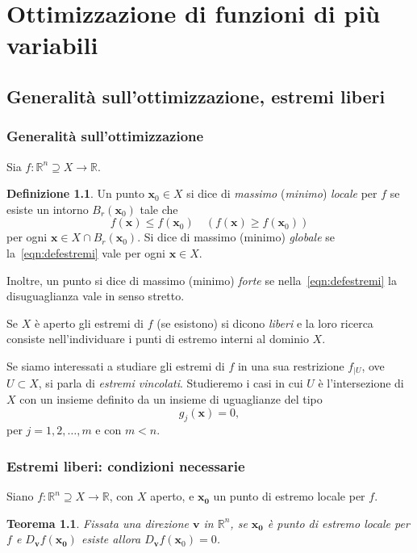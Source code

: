 \documentclass[a4paper]{book}
\numberwithin{equation}{section}
\theoremstyle{plain}
\newtheorem{teor}{Teorema}[section]
\theoremstyle{definition}
\newtheorem{defn}{Definizione}[section]
\theoremstyle{remark}
\renewcommand{\vec}{\boldsymbol}
\theoremstyle{example}
\begin{document}
\chapter{Ottimizzazione di funzioni di più variabili}
\section{Generalità sull'ottimizzazione, estremi liberi}
\subsection{Generalità sull'ottimizzazione}
Sia $f\colon \mathbb{R}^n \supseteq X \to \mathbb{R}$.
\begin{defn}
	Un punto $\vec{x}_0 \in X$ si dice di \emph{massimo} (\emph{minimo}) \emph{locale} per $f$ se esiste un intorno $B_r(\vec{x}_0)$ tale che
	\begin{equation}
		\label{eqn:defestremi}
		f(\vec{x}) \le f(\vec{x}_0) 	\quad (f(\vec{x}) \ge f(\vec{x}_0))
		\end{equation}per ogni $\vec{x} \in X \cap B_r(\vec{x}_0)$. Si dice di massimo (minimo) \emph{globale} se la~\eqref{eqn:defestremi} vale per ogni $\vec{x} \in X$.
	\end{defn}

	Inoltre, un punto si dice di massimo (minimo) \emph{forte} se nella~\eqref{eqn:defestremi} la disuguaglianza vale in senso stretto.

	Se $X$ è aperto gli estremi di $f$ (se esistono) si dicono \emph{liberi} e la loro ricerca consiste nell'individuare i punti di estremo interni al dominio $X$.

	Se siamo interessati a studiare gli estremi di $f$ in una sua restrizione $f_{|U}$, ove $U \subset X$, si parla di \emph{estremi vincolati}. Studieremo i casi in cui $U$ è l'intersezione di $X$ con un insieme definito da un insieme di uguaglianze del tipo
	\begin{equation*}
		g_j(\vec{x}) = 0,
	\end{equation*}
	per $j = 1, 2, \dots, m$ e con $m < n$.

	\subsection{Estremi liberi: condizioni necessarie}
	Siano $f \colon \mathbb{R}^n \supseteq X \to \mathbb{R}$, con $X$ aperto, e $\vec{x_0}$ un punto di estremo locale per $f$.
	\begin{teor}
		Fissata una direzione $\vec{v}$ in $\mathbb{R}^n$, se $\vec{x_0}$ è punto di estremo locale per $f$ e $D_{\vec{v}}f(\vec{x_0})$ esiste allora $D_{\vec{v}}f(\vec{x}_0) = 0$.
	\end{teor}
\end{document}
